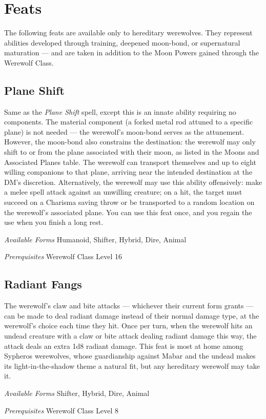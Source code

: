 \documentclass[twocolumn]{dndbook}
\begin{document}
\section*{Feats}

The following feats are available only to hereditary werewolves.
They represent abilities developed through training, deepened moon-bond, or supernatural maturation --- and are taken in addition to the Moon Powers gained through the Werewolf Class.

\subsection*{Plane Shift}
Same as the \emph{Plane Shift} spell, except this is an innate ability requiring no components.
The material component (a forked metal rod attuned to a specific plane) is not needed --- the werewolf's moon-bond serves as the attunement.
However, the moon-bond also constrains the destination: the werewolf may only shift to or from the plane associated with their moon, as listed in the Moons and Associated Planes table.
The werewolf can transport themselves and up to eight willing companions to that plane, arriving near the intended destination at the DM's discretion.
Alternatively, the werewolf may use this ability offensively: make a melee spell attack against an unwilling creature; on a hit, the target must succeed on a Charisma saving throw or be transported to a random location on the werewolf's associated plane.
You can use this feat once, and you regain the use when you finish a long rest.\par
\emph{Available Forms} Humanoid, Shifter, Hybrid, Dire, Animal\par
\emph{Prerequisites} Werewolf Class Level 16\par

\subsection*{Radiant Fangs}
The werewolf's claw and bite attacks --- whichever their current form grants --- can be made to deal radiant damage instead of their normal damage type, at the werewolf's choice each time they hit.
Once per turn, when the werewolf hits an undead creature with a claw or bite attack dealing radiant damage this way, the attack deals an extra 1d8 radiant damage.
This feat is most at home among Sypheros werewolves, whose guardianship against Mabar and the undead makes its light-in-the-shadow theme a natural fit, but any hereditary werewolf may take it.\par
\emph{Available Forms} Shifter, Hybrid, Dire, Animal\par
\emph{Prerequisites} Werewolf Class Level 8\par
\end{document}
